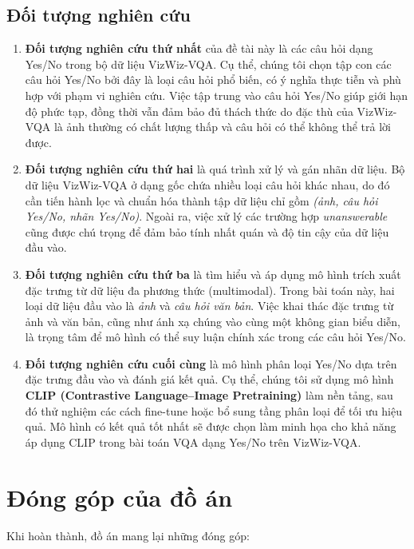 \subsection{Đối tượng nghiên cứu}
\begin{enumerate}
    \item \textbf{Đối tượng nghiên cứu thứ nhất} của đề tài này là các câu hỏi dạng Yes/No trong bộ dữ liệu VizWiz-VQA. 
    Cụ thể, chúng tôi chọn tập con các câu hỏi Yes/No bởi đây là loại câu hỏi phổ biến, có ý nghĩa thực tiễn và phù hợp với phạm vi nghiên cứu. 
    Việc tập trung vào câu hỏi Yes/No giúp giới hạn độ phức tạp, đồng thời vẫn đảm bảo đủ thách thức do đặc thù của VizWiz-VQA là ảnh thường có chất lượng thấp và câu hỏi có thể không thể trả lời được.  

    \item \textbf{Đối tượng nghiên cứu thứ hai} là quá trình xử lý và gán nhãn dữ liệu. 
    Bộ dữ liệu VizWiz-VQA ở dạng gốc chứa nhiều loại câu hỏi khác nhau, do đó cần tiến hành lọc và chuẩn hóa thành tập dữ liệu chỉ gồm \textit{(ảnh, câu hỏi Yes/No, nhãn Yes/No)}. 
    Ngoài ra, việc xử lý các trường hợp \textit{unanswerable} cũng được chú trọng để đảm bảo tính nhất quán và độ tin cậy của dữ liệu đầu vào.  

    \item \textbf{Đối tượng nghiên cứu thứ ba} là tìm hiểu và áp dụng mô hình trích xuất đặc trưng từ dữ liệu đa phương thức (multimodal). 
    Trong bài toán này, hai loại dữ liệu đầu vào là \textit{ảnh} và \textit{câu hỏi văn bản}. 
    Việc khai thác đặc trưng từ ảnh và văn bản, cũng như ánh xạ chúng vào cùng một không gian biểu diễn, là trọng tâm để mô hình có thể suy luận chính xác trong các câu hỏi Yes/No.  

    \item \textbf{Đối tượng nghiên cứu cuối cùng} là mô hình phân loại Yes/No dựa trên đặc trưng đầu vào và đánh giá kết quả. 
    Cụ thể, chúng tôi sử dụng mô hình \textbf{CLIP (Contrastive Language--Image Pretraining)} làm nền tảng, sau đó thử nghiệm các cách fine-tune hoặc bổ sung tầng phân loại để tối ưu hiệu quả. 
    Mô hình có kết quả tốt nhất sẽ được chọn làm minh họa cho khả năng áp dụng CLIP trong bài toán VQA dạng Yes/No trên VizWiz-VQA.  
\end{enumerate}

\section{Đóng góp của đồ án}
Khi hoàn thành, đồ án mang lại những đóng góp:

